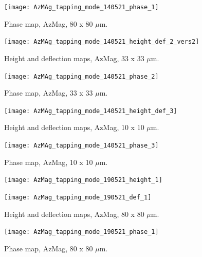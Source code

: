 \begin{figure}[H]
\centering
  \texttt{[image: AzMAg\_tapping\_mode\_140521\_phase\_1]}
\caption[Phase map, AzMag]{Phase map, AzMag, 80 x 80 $\mu$m.}
\label{fig:afm_azmag_phase_1}
\end{figure}


\begin{figure}[H]
\centering
  \texttt{[image: AzMAg\_tapping\_mode\_140521\_height\_def\_2\_vers2]}
\caption[Height and deflection maps, AzMag]{Height and deflection maps, AzMag, 33 x 33 $\mu$m.}
\label{fig:afm_azmag_height_def_2}
\end{figure}

\begin{figure}[H]
\centering
  \texttt{[image: AzMAg\_tapping\_mode\_140521\_phase\_2]}
\caption[Phase map, AzMag]{Phase map, AzMag, 33 x 33 $\mu$m.}
\label{fig:afm_azmag_phase_2}
\end{figure}


\begin{figure}[H]
\centering
  \texttt{[image: AzMAg\_tapping\_mode\_140521\_height\_def\_3]}
\caption[Height and deflection maps, AzMag]{Height and deflection maps, AzMag, 10 x 10 $\mu$m.}
\label{fig:afm_azmag_height_def_3}
\end{figure}

\begin{figure}[H]
\centering
  \texttt{[image: AzMAg\_tapping\_mode\_140521\_phase\_3]}
\caption[Phase map, AzMag]{Phase map, AzMag, 10 x 10 $\mu$m.}
\label{fig:afm_azmag_phase_3}
\end{figure}


\begin{figure}[H]
\centering
\begin{minipage}{.45\textwidth}
  \centering
  \texttt{[image: AzMag\_tapping\_mode\_190521\_height\_1]}
\end{minipage}
\begin{minipage}{.45\textwidth}
  \centering
  \texttt{[image: AzMag\_tapping\_mode\_190521\_def\_1]}
\end{minipage}
\caption[Height and deflection maps, AzMag]{Height and deflection maps, AzMag, 80 x 80 $\mu$m.}
\label{fig:afm_azmag_height_def_4}
\end{figure}

\begin{figure}[H]
\centering
  \texttt{[image: AzMag\_tapping\_mode\_190521\_phase\_1]}
\caption[Phase map, AzMag]{Phase map, AzMag, 80 x 80 $\mu$m.}
\label{fig:afm_azmag_phase_4}
\end{figure}



